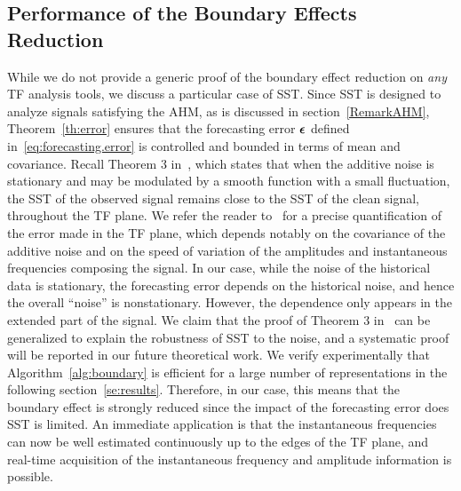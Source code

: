 \subsection{Performance of the Boundary Effects Reduction}
\label{sse:perf.BoundEffRed}
While we do not provide a generic proof of the boundary effect reduction on {\em any} TF analysis tools, we discuss a particular case of SST. Since SST is designed to analyze signals satisfying the AHM, as is discussed in section~\ref{RemarkAHM}, Theorem~\ref{th:error} ensures that the forecasting error $\boldsymbol{\epsilon}$ defined in~\eqref{eq:forecasting.error} is controlled and bounded in terms of mean and covariance. Recall Theorem 3 in~\cite{Chen14nonparametric}, which states that when the additive noise is stationary and may be modulated by a smooth function with a small fluctuation, the SST of the observed signal remains close to the SST of the clean signal, throughout the TF plane. 
%
We refer the reader to~\cite{Chen14nonparametric} for a precise quantification of the error made in the TF plane, which depends notably on the covariance of the additive noise and on the speed of variation of the amplitudes and instantaneous frequencies composing the signal. 
%
In our case, while the noise of the historical data is stationary, the forecasting error depends on the historical noise, and hence the overall ``noise'' is nonstationary. However, the dependence only appears in the extended part of the signal. We claim that the proof of Theorem 3 in~\cite{Chen14nonparametric} can be generalized to explain the robustness of SST to the noise, and a systematic proof will be reported in our future theoretical work. We verify experimentally that Algorithm~\ref{alg:boundary} is efficient for a large number of representations in the following section~\ref{se:results}. 
%
Therefore, in our case, this means that the boundary effect is strongly reduced since the impact of the forecasting error does SST is limited. An immediate application is that the instantaneous frequencies can now be well estimated continuously up to the edges of the TF plane, and real-time acquisition of the instantaneous frequency and amplitude information is possible.